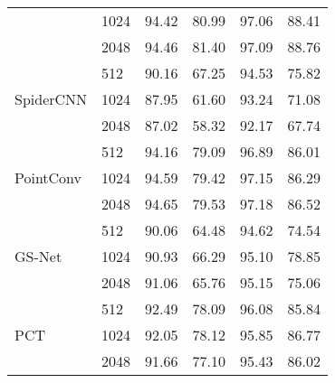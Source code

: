\documentclass[10pt,twocolumn,letterpaper]{article}
\begin{document}
\begin{table}
\begin{tabular}{l|lllll}
                                                    & 1024 & 94.42 & 80.99 & 97.06 & 88.41 \\
                                                    & \cellcolor{Lavender}2048 & \cellcolor{Lavender}94.46 & \cellcolor{Lavender}81.40 & \cellcolor{Lavender}97.09 & \cellcolor{Lavender}88.76 \\ 
\hline
\multirow{3}{*}{SpiderCNN \cite{xu2018spidercnn}}   & \cellcolor{Apricot}512  & \cellcolor{Apricot}90.16 & \cellcolor{Apricot}67.25 & \cellcolor{Apricot}94.53 & \cellcolor{Apricot}75.82 \\
                                                    & 1024 & 87.95 & 61.60 & 93.24 & 71.08 \\
                                                    & \cellcolor{Lavender}2048 & \cellcolor{Lavender}87.02 & \cellcolor{Lavender}58.32 & \cellcolor{Lavender}92.17 & \cellcolor{Lavender}67.74 \\ 
\hline
\multirow{3}{*}{PointConv \cite{wu2019pointconv}}   & \cellcolor{Apricot}512  & \cellcolor{Apricot}94.16 & \cellcolor{Apricot}79.09 & \cellcolor{Apricot}96.89 & \cellcolor{Apricot}86.01 \\
                                                    & 1024 & 94.59 & 79.42 & 97.15 & 86.29 \\
                                                    & \cellcolor{Lavender}2048 & \cellcolor{Lavender}94.65 & \cellcolor{Lavender}79.53 & \cellcolor{Lavender}97.18 & \cellcolor{Lavender}86.52 \\ 
\hline
\multirow{3}{*}{GS-Net \cite{xu2020geometry}}       & \cellcolor{Apricot}512  & \cellcolor{Apricot}90.06 & \cellcolor{Apricot}64.48 & \cellcolor{Apricot}94.62 & \cellcolor{Apricot}74.54 \\
                                                    & 1024 & 90.93 & 66.29 & 95.10 & 78.85 \\
                                                    & \cellcolor{Lavender}2048 & \cellcolor{Lavender}91.06 & \cellcolor{Lavender}65.76 & \cellcolor{Lavender}95.15 & \cellcolor{Lavender}75.06 \\ 
\hline
\multirow{3}{*}{PCT \cite{guo2020pct}}              & \cellcolor{Apricot}512  & \cellcolor{Apricot}92.49 & \cellcolor{Apricot}78.09 & \cellcolor{Apricot}96.08 & \cellcolor{Apricot}85.84 \\
                                                    & 1024 & 92.05 & 78.12 & 95.85 & 86.77 \\
                                                    & \cellcolor{Lavender}2048 & \cellcolor{Lavender}91.66 & \cellcolor{Lavender}77.10 & \cellcolor{Lavender}95.43 & \cellcolor{Lavender}86.02 \\

\end{tabular}
\end{table}
\end{document}
